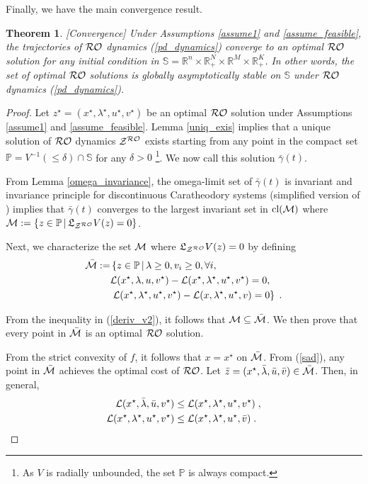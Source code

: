 \documentclass[journal,twoside,web]{ieeecolor}
\newtheorem{theorem}{Theorem}
\begin{document}
Finally, we have the main convergence result.
\begin{theorem} \label{maintheorem} [Convergence]
Under Assumptions \ref{assume1} and \ref{assume_feasible}, the trajectories of ${\cal RO}$ dynamics (\ref{pd_dynamics}) converge to an optimal ${\cal RO}$ solution for any initial condition in $\mathbb{S}=\mathbb{R}^n\times \mathbb{R}^N_{+}\times \mathbb{R}^M\times \mathbb{R}^K_+$. In other words, the set of optimal ${\cal RO}$ solutions is globally asymptotically stable on $\mathbb{S}$ under ${\cal RO}$ dynamics (\ref{pd_dynamics}).
\end{theorem}
\begin{proof}
Let $z^\star=(x^\star,\lambda^\star,u^\star,v^\star)$ be an optimal ${\cal RO}$ solution under Assumptions \ref{assume1} and \ref{assume_feasible}. Lemma \ref{uniq_exis} implies that a unique solution of ${\cal RO}$ dynamics ${\cal Z}^{\cal RO}$ exists starting from any point in the compact set $\mathbb P=V^{-1}(\leq \delta) \cap \mathbb S$ for any $\delta>0$ \footnote{As $V$ is radially unbounded, the set $\mathbb P$ is always compact.}. We now call this solution $\bar \gamma(t)$.

From Lemma \ref{omega_invariance}, the omega-limit set of $\bar \gamma(t)$ is invariant and invariance principle for discontinuous Caratheodory systems \cite[Proposition~2.1]{cherukuri2016} (simplified version of \cite[Proposition~3]{bacciotti2006nonpathological}) implies that $\bar \gamma(t)$ converges to the largest invariant set in $\text{cl}({\cal M})$ where ${\cal M}:=\{z \in \mathbb P\,|\, \mathfrak{L}_{{\cal Z}^{\cal RO}}V(z)=0\}$.

Next, we characterize the set ${\cal M}$ where $\mathfrak{L}_{{\cal Z}^{\cal RO}}V(z)=0$ by defining
\begin{align}
\bar{\cal M}:=& \left\{z \in \mathbb P\,\middle|\,\lambda\geq 0, v_i\geq 0, \forall i, \right. \nonumber\\
&{\cal L}(x^\star,\lambda,u,v^\star)-{\cal L}(x^\star,\lambda^\star,u^\star,v^\star)=0, \nonumber\\
&\left. {\cal L}(x^\star,\lambda^\star,u^\star,v^\star)-{\cal L}(x,\lambda^\star,u^\star,v)=0 \right\}\;.\label{sad}
\end{align}

From the inequality in (\ref{deriv_v2}), it follows that ${\cal M} \subseteq \bar{\cal M}$. We then prove that every point in $\bar{\cal M}$ is an optimal ${\cal RO}$ solution.

From the strict convexity of $f$, it follows that $x=x^\star$ on $\bar{\cal M}$. From (\ref{sad}), any point in $\bar{\cal M}$ achieves the optimal cost of ${\cal RO}$. Let $\bar{z}=(x^\star,\bar{\lambda},\bar{u},\bar{v})\in \bar{\cal M}$\;. Then, in general,
\begin{align*}
    {\cal L}(x^\star,\bar{\lambda},\bar{u},v^\star) &\leq {\cal L}(x^\star,\lambda^\star,u^\star,v^\star)\;, \\
    {\cal L}(x^\star,\lambda^\star,u^\star,v^\star) &\leq {\cal L}(x^\star,\lambda^\star,u^\star,\bar{v})\;.
\end{align*}


\end{proof}
\end{document}
